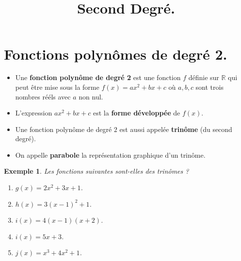 \documentclass[a4paper,11pt]{article}
\title{Second Degré.}
\author{}
\date{}
\theoremstyle{break}
\newcounter{enonce}
\newtheorem{exemple}[enonce]{Exemple}
\begin{document}
 
  \maketitle


  
  \section{Fonctions polynômes de degré 2.}
  
  
  \begin{definition}
    \begin{itemize}
     \item Une \textbf{fonction polynôme de degré 2} est une fonction $f$ définie sur $\mathbb{R}$
    qui peut être mise sous la forme $f(x)=ax^2+bx+c$ où $a,b,c$ sont trois nombres 
    rééls avec $a$ non nul.
     
     \item L'expression $ax^2+bx+c$ est la \textbf{forme développée} de $f(x)$.
     \item Une fonction polynôme de degré $2$ est aussi appelée 
     \textbf{trinôme} (du second degré).
     \item On appelle \textbf{parabole} la représentation graphique 
     d'un trinôme.
   \end{itemize}    
  \end{definition}
  
  
  
  \begin{exemple}
    Les fonctions suivantes sont-elles des trinômes ?
    \begin{enumerate}
     \item $g(x)=2x^2+3x+1$. 
     \item $h(x)=3(x-1)^2+1$.
     \item $i(x)=4(x-1)(x+2)$.
     \item $i(x)=5x+3$.
     \item $j(x)=x^3+4x^2+1$.
     \end{enumerate}
 
 \end{exemple}
  
\end{document}
